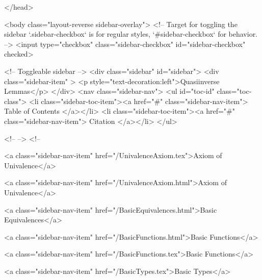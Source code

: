   
</head>




  <body class="layout-reverse sidebar-overlay">
    <!-- Target for toggling the sidebar `.sidebar-checkbox` is for regular
     styles, `#sidebar-checkbox` for behavior. -->
<input type="checkbox" class="sidebar-checkbox" id="sidebar-checkbox" checked>

<!-- Toggleable sidebar -->
<div class="sidebar" id="sidebar">
  <div class="sidebar-item" >
    <p style="text-decoration:left">Quasiinverse Lemmas</p>
  </div>
  <nav class="sidebar-nav">
    <ul id="toc-id" class="toc-class">
  <li class="sidebar-toc-item"><a href="#" class="sidebar-nav-item"> Table of Contents </a></li>
  <li class="sidebar-toc-item"><a href="#" class="sidebar-nav-item"> Citation </a></li>
</ul>


    <!--  -->
    <!-- 
      
    
      
    
      
    
      
    
      
        
      
    
      
        
          <a class="sidebar-nav-item" href="/UnivalenceAxiom.tex">Axiom of Univalence</a>
        
      
    
      
        
          <a class="sidebar-nav-item" href="/UnivalenceAxiom.html">Axiom of Univalence</a>
        
      
    
      
        
          <a class="sidebar-nav-item" href="/BasicEquivalences.html">Basic Equivalences</a>
        
      
    
      
        
          <a class="sidebar-nav-item" href="/BasicFunctions.html">Basic Functions</a>
        
      
    
      
        
          <a class="sidebar-nav-item" href="/BasicFunctions.tex">Basic Functions</a>
        
      
    
      
        
          <a class="sidebar-nav-item" href="/BasicTypes.tex">Basic Types</a>
        
